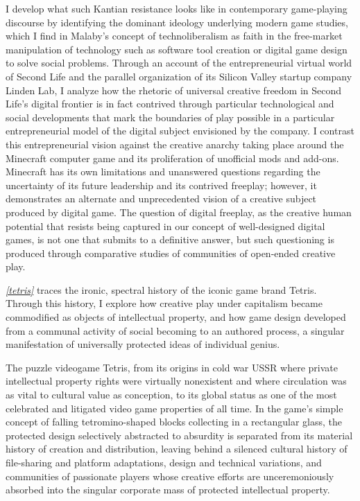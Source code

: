 I develop what such Kantian resistance looks like in contemporary game-playing discourse by identifying the dominant ideology underlying modern game studies, which I find in Malaby's concept of technoliberalism as faith in the free-market manipulation of technology such as software tool creation or digital game design to solve social problems. Through an account of the entrepreneurial virtual world of Second Life and the parallel organization of its Silicon Valley startup company Linden Lab, I analyze how the rhetoric of universal creative freedom in Second Life's digital frontier is in fact contrived through particular technological and social developments that mark the boundaries of play possible in a particular entrepreneurial model of the digital subject envisioned by the company. I contrast this entrepreneurial vision against the creative anarchy taking place around the Minecraft computer game and its proliferation of unofficial mods and add-ons. Minecraft has its own limitations and unanswered questions regarding the uncertainty of its future leadership and its contrived freeplay; however, it demonstrates an alternate and unprecedented vision of a creative subject produced by digital game. The question of digital freeplay, as the creative human potential that resists being captured in our concept of well-designed digital games, is not one that submits to a definitive answer, but such questioning is produced through comparative studies of communities of open-ended creative play.

\emph{\cref{tetris}} traces the ironic, spectral history of the iconic game brand Tetris. Through this history, I explore how creative play under capitalism became commodified as objects of intellectual property, and how game design developed from a communal activity of social becoming to an authored process, a singular manifestation of universally protected ideas of individual genius.

The puzzle videogame Tetris, from its origins in cold war USSR where private intellectual property rights were virtually nonexistent and where circulation was as vital to cultural value as conception, to its global status as one of the most celebrated and litigated video game properties of all time. In the game's simple concept of falling tetromino-shaped blocks collecting in a rectangular glass, the protected design selectively abstracted to absurdity is separated from its material history of creation and distribution, leaving behind a silenced cultural history of file-sharing and platform adaptations, design and technical variations, and communities of passionate players whose creative efforts are unceremoniously absorbed into the singular corporate mass of protected intellectual property.


